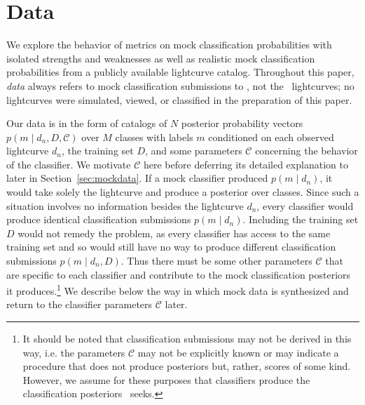 \section{Data}
\label{sec:data}

We explore the behavior of metrics on mock classification probabilities with isolated strengths and weaknesses as well as realistic mock classification probabilities from a publicly available lightcurve catalog.
Throughout this paper, \textit{data} always refers to mock classification submissions to \plasticc, not the \plasticc\ lightcurves; no lightcurves were simulated, viewed, or classified in the preparation of this paper.

Our data is in the form of catalogs of $N$ posterior probability vectors $p(m \mid d_{n}, D, \mathcal{C})$ over $M$ classes with labels $m$ conditioned on each observed lightcurve $d_{n}$, the training set $D$, and some parameters $\mathcal{C}$ concerning the behavior of the classifier.
We motivate $\mathcal{C}$ here before deferring its detailed explanation to later in Section~\ref{sec:mockdata}.
If a mock classifier produced $p(m \mid d_{n})$, it would take solely the lightcurve and produce a posterior over classes.
Since such a situation involves no information besides the lightcurve $d_{n}$, every classifier would produce identical classification submissions $p(m \mid d_{n})$.
Including the training set $D$ would not remedy the problem, as every classifier has access to the same training set and so would still have no way to produce different classification submissions $p(m \mid d_{n}, D)$.
Thus there must be some other parameters $\mathcal{C}$ that are specific to each classifier and contribute to the mock classification posteriors it produces.\footnote{It should be noted that classification submissions may not be derived in this way, i.e. the parameters $\mathcal{C}$ may not be explicitly known or may indicate a procedure that does not produce posteriors but, rather, scores of some kind.  However, we assume for these purposes that classifiers produce the classification posteriors \plasticc\ seeks.}
We describe below the way in which mock data is synthesized and return to the classifier parameters $\mathcal{C}$ later.

